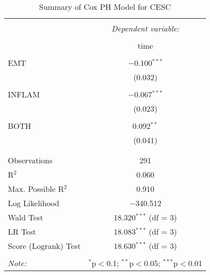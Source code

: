 
\begin{table}[!htbp] \centering 
  \caption{Summary of Cox PH Model for CESC} 
  \label{table:CESC_cph} 
\begin{tabular}{@{\extracolsep{5pt}}lc} 
\\[-1.8ex]\hline 
\hline \\[-1.8ex] 
 & \multicolumn{1}{c}{\textit{Dependent variable:}} \\ 
\cline{2-2} 
\\[-1.8ex] & time \\ 
\hline \\[-1.8ex] 
 EMT & $-$0.100$^{***}$ \\ 
  & (0.032) \\ 
  & \\ 
 INFLAM & $-$0.067$^{***}$ \\ 
  & (0.023) \\ 
  & \\ 
 BOTH & 0.092$^{**}$ \\ 
  & (0.041) \\ 
  & \\ 
\hline \\[-1.8ex] 
Observations & 291 \\ 
R$^{2}$ & 0.060 \\ 
Max. Possible R$^{2}$ & 0.910 \\ 
Log Likelihood & $-$340.512 \\ 
Wald Test & 18.320$^{***}$ (df = 3) \\ 
LR Test & 18.083$^{***}$ (df = 3) \\ 
Score (Logrank) Test & 18.630$^{***}$ (df = 3) \\ 
\hline 
\hline \\[-1.8ex] 
\textit{Note:}  & \multicolumn{1}{r}{$^{*}$p$<$0.1; $^{**}$p$<$0.05; $^{***}$p$<$0.01} \\ 
\end{tabular} 
\end{table} 
